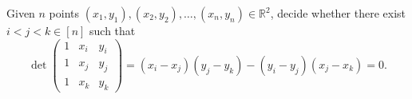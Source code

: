 \begin{problem}[GPT]
	Given \(n\) points \((x_1,y_1), (x_2,y_2), \ldots, (x_n,y_n) \in \mathbb{R}^2\), decide
	whether there exist \(i < j < k \in [n]\) such that
	\begin{displaymath}
		\det
		\left(
		\begin{matrix}
		1 & x_i & y_i \\
		1 & x_j & y_j \\
		1 & x_k & y_k
		\end{matrix}
		\right)
		=
		(x_i - x_j)(y_j - y_k) - (y_i - y_j)(x_j - x_k)
		= 0.
	\end{displaymath}
\end{problem}
